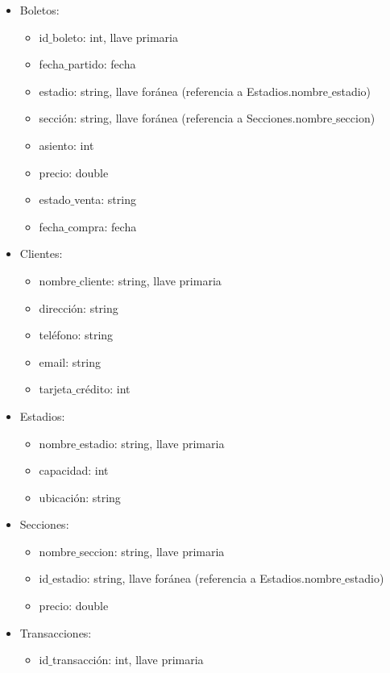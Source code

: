 \begin{itemize}
    \item Boletos:
    \begin{itemize}
        \item id$\_$boleto: int, llave primaria
        \item fecha$\_$partido: fecha
        \item estadio: string, llave foránea (referencia a Estadios.nombre$\_$estadio)
        \item sección: string, llave foránea (referencia a Secciones.nombre$\_$seccion)
        \item asiento: int
        \item precio: double
        \item estado$\_$venta: string
        \item fecha$\_$compra: fecha
    \end{itemize}
    \item Clientes:
    \begin{itemize}
        \item nombre$\_$cliente: string, llave primaria
        \item dirección: string
        \item teléfono: string
        \item email: string
        \item tarjeta$\_$crédito: int
    \end{itemize}
    \item Estadios:
    \begin{itemize}
        \item nombre$\_$estadio: string, llave primaria
        \item capacidad: int
        \item ubicación: string        
    \end{itemize}
    \item Secciones:
    \begin{itemize}
        \item nombre$\_$seccion: string, llave primaria
        \item id$\_$estadio: string, llave foránea (referencia a Estadios.nombre$\_$estadio)
        \item precio: double        
    \end{itemize}
    \item Transacciones:
    \begin{itemize}
        \item id$\_$transacción: int, llave primaria

\end{itemize}
\end{itemize}
